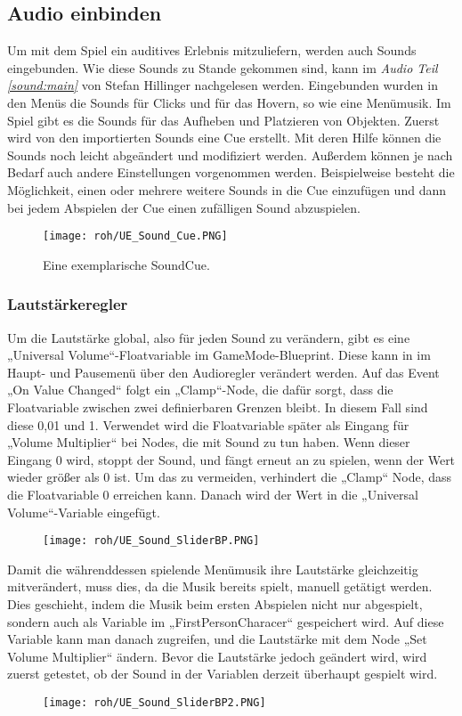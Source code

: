 \subsection{Audio einbinden}
\label{UE:AudioEinbinden}
Um mit dem Spiel ein auditives Erlebnis mitzuliefern, werden auch Sounds eingebunden. Wie diese Sounds zu Stande gekommen sind, kann im \textit{Audio Teil \ref{sound:main}} von Stefan Hillinger nachgelesen werden.
Eingebunden wurden in den Menüs die Sounds für Clicks und für das Hovern, so wie eine Menümusik. Im Spiel gibt es die Sounds für das Aufheben und Platzieren von Objekten.
Zuerst wird von den importierten Sounds eine Cue erstellt. Mit deren Hilfe können die Sounds noch leicht abgeändert und modifiziert werden. Außerdem können je nach Bedarf auch andere Einstellungen vorgenommen werden. Beispielweise besteht die Möglichkeit, einen oder mehrere weitere Sounds in die Cue einzufügen und dann bei jedem Abspielen der Cue einen zufälligen Sound abzuspielen.
\begin{figure}[H]
    \centering
    \texttt{[image: roh/UE\_Sound\_Cue.PNG]}
    \caption{Eine exemplarische SoundCue.}
    \label{UE:Sound_Cue}
\end{figure}
\subsubsection{Lautstärkeregler}
Um die Lautstärke global, also für jeden Sound zu verändern, gibt es eine „Universal Volume“-Floatvariable im GameMode-Blueprint. Diese kann in im Haupt- und Pausemenü über den Audioregler verändert werden. Auf das Event „On Value Changed“ folgt ein „Clamp“-Node, die dafür sorgt, dass die Floatvariable zwischen zwei definierbaren Grenzen bleibt. In diesem Fall sind diese 0,01 und 1.
Verwendet wird die Floatvariable später als Eingang für „Volume Multiplier“ bei Nodes, die mit Sound zu tun haben. Wenn dieser Eingang 0 wird, stoppt der Sound, und fängt erneut an zu spielen, wenn der Wert wieder größer als 0 ist. Um das zu vermeiden, verhindert die „Clamp“ Node, dass die Floatvariable 0 erreichen kann. Danach wird der Wert in die „Universal Volume“-Variable eingefügt.
\begin{figure}[H]
    \centering
    \texttt{[image: roh/UE\_Sound\_SliderBP.PNG]}
    \label{UE:Sound_SliderBP}
\end{figure}
Damit die währenddessen spielende Menümusik ihre Lautstärke gleichzeitig mitverändert, muss dies, da die Musik bereits spielt, manuell getätigt werden.
Dies geschieht, indem die Musik beim ersten Abspielen nicht nur abgespielt, sondern auch als Variable im „FirstPersonCharacer“ gespeichert wird. Auf diese Variable kann man danach zugreifen, und die Lautstärke mit dem Node „Set Volume Multiplier“ ändern. Bevor die Lautstärke jedoch geändert wird, wird zuerst getestet, ob der Sound in der Variablen derzeit überhaupt gespielt wird.
\begin{figure}[H]
    \centering
    \texttt{[image: roh/UE\_Sound\_SliderBP2.PNG]}
    \label{UE:Sound_SliderBP2}
\end{figure}

